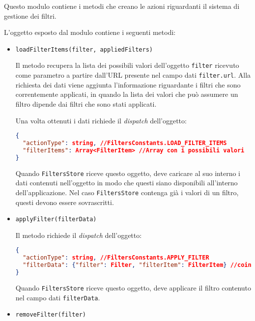 
Questo modulo contiene i metodi che creano le azioni riguardanti il sistema di gestione dei filtri.

L'oggetto esposto dal modulo contiene i seguenti metodi:
\begin{itemize}
\item \texttt{loadFilterItems(filter, appliedFilters)}

Il metodo recupera la lista dei possibili valori dell'oggetto \texttt{filter} ricevuto come parametro a partire dall'URL presente nel campo dati \texttt{filter.url}. 
Alla richiesta dei dati viene aggiunta l'informazione riguardante i filtri che sono correntemente applicati, in quando la lista dei valori che può assumere un filtro dipende dai filtri che sono stati applicati.

Una volta ottenuti i dati richiede il \textit{dispatch} dell'oggetto:
\begin{lstlisting}[language=JSON, caption=Action - load filter items]
{
  "actionType": string, //FiltersConstants.LOAD_FILTER_ITEMS
  "filterItems": Array<FilterItem> //Array con i possibili valori
}
\end{lstlisting}

Quando \texttt{FiltersStore} riceve questo oggetto, deve caricare al suo interno i dati contenuti nell'oggetto in modo che questi siano disponibili all'interno dell'applicazione. Nel caso \texttt{FiltersStore} contenga già i valori di un filtro, questi devono essere sovrascritti.

\item \texttt{applyFilter(filterData)}

Il metodo richiede il \textit{dispatch} dell'oggetto:
\begin{lstlisting}[language=JSON, caption=Action - apply filter]
{
  "actionType": string, //FiltersConstants.APPLY_FILTER
  "filterData": {"filter": Filter, "filterItem": FilterItem} //coincide con l'oggetto ricevuto come parametro
}
\end{lstlisting}

Quando \texttt{FiltersStore} riceve questo oggetto, deve applicare il filtro contenuto nel campo dati \texttt{filterData}.

\item \texttt{removeFilter(filter)}


\end{itemize}
